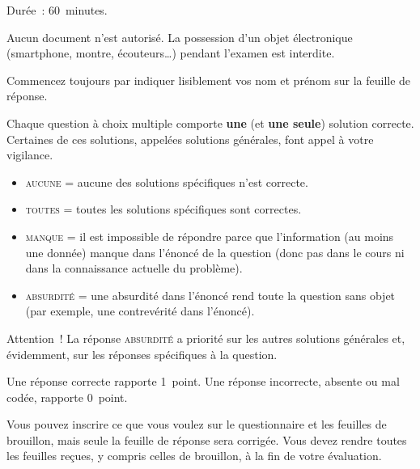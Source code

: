 \documentclass[11pt,french,a4paper,twoside]{article}
\newcommand{\thesubtitle}{Examen blanc du \thedate{}}
\begin{document}
\begin{examcopy}[2]
  \setcounter{figure}{0}
  \noindent{\bf \thetitle{} \hfill{} \thesubtitle{}}

  \vspace{2ex}

  Durée~: 60~minutes.

  Aucun document n'est autorisé.
  La possession d'un objet électronique (smartphone, montre, écouteurs\ldots{}) pendant l'examen est interdite.

  Commencez toujours par indiquer lisiblement vos nom et prénom sur la feuille de réponse.

  Chaque question à choix multiple comporte \textbf{une} (et \textbf{une seule}) solution correcte.
  Certaines de ces solutions, appelées solutions générales, font appel à votre vigilance.
  \begin{itemize}
    \item \textsc{aucune} = aucune des solutions spécifiques n'est correcte.
    \item \textsc{toutes} = toutes les solutions spécifiques sont correctes.
    \item \textsc{manque} = il est impossible de répondre parce que l'information (au moins une donnée) manque dans l'énoncé de la question (donc pas dans le cours ni dans la connaissance actuelle du problème).
    \item \textsc{absurdité} = une absurdité dans l'énoncé rend toute la question sans objet (par exemple, une contrevérité dans l'énoncé).
  \end{itemize}
  Attention~! La réponse \textsc{absurdité} a priorité sur les autres solutions générales et, évidemment, sur les réponses spécifiques à la question.

  Une réponse correcte rapporte 1~point.
  Une réponse incorrecte, absente ou mal codée, rapporte 0~point.

  Vous pouvez inscrire ce que vous voulez sur le questionnaire et les feuilles de brouillon, mais seule la feuille de réponse sera corrigée.
  Vous devez rendre toutes les feuilles reçues, y compris celles de brouillon, à la fin de votre évaluation.

  \noindent{\hrulefill{}}

  \vspace{2ex}





\end{examcopy}
\end{document}

